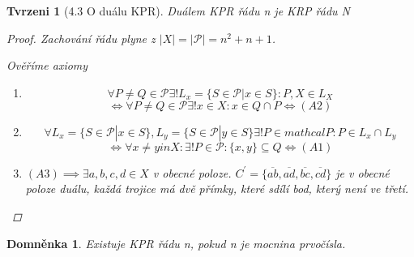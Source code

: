 \documentclass[10pt,a4paper]{article}
\theoremstyle{plain}
\newtheorem*{tvrzeni}{Tvrzeni}
\newtheorem*{domnenka}{Domněnka}
\begin{document}
\begin{tvrzeni}[4.3 O duálu KPR]
Duálem KPR řádu n je KRP řádu N
\begin{proof}
Zachování řádu plyne z $|X| = |\mathcal{P}| = n^2+n+1$.

Ověříme axiomy \begin{enumerate}[label=(A\arabic*)*]
\item \[\forall P \neq Q \in \mathcal{P} \exists! L_x = \{ S \in \mathcal{P} | x \in S\}: P,X \in L_X \]
\[\iff  \forall P \neq Q \in \mathcal{P} \exists! x \in X: x \in Q \cap P \iff (A2) \]

\item \[\forall L_x = \{ S \in \mathcal{P} | x \in S\}, L_y = \{ S \in \mathcal{P} | y \in S\} \exists! P \in mathcal{P}: P \in L_x \cap L_y \]
\[\iff \forall x\neq y in X: \exists! P \in \mathcal{P}: \{x,y\} \subseteq Q \iff (A1)\]
\item $(A3) \implies \exists a,b,c,d \in X$ v obecné poloze.
$C^\prime = \{\overline{ab}, \overline{ad}, \overline{bc}, \overline{cd}\}$ je v obecné poloze duálu, každá trojice má dvě přímky, které sdílí bod, který není ve třetí.
\end{enumerate}
\end{proof}
\end{tvrzeni}

\begin{domnenka}
Existuje KPR řádu n, pokud n je mocnina prvočísla.
\end{domnenka}
\end{document}
